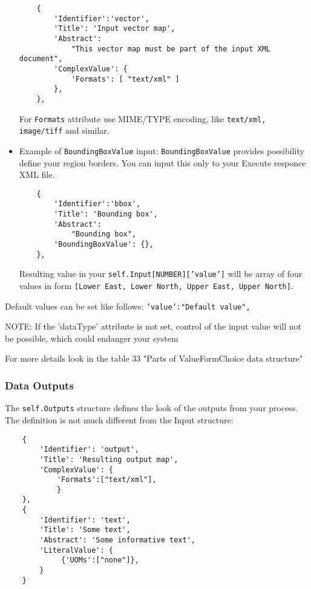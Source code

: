 \documentclass[a4paper,11pt]{article}
\begin{document}
\begin{itemize}
    \begin{verbatim}
    {
        'Identifier':'vector',
        'Title': 'Input vector map',
        'Abstract':
            "This vector map must be part of the input XML document",
        'ComplexValue': {
            'Formats': [ "text/xml" ]
        },
    },
    \end{verbatim}

    For \texttt{Formats} attribute use MIME/TYPE encoding, like
    \texttt{text/xml, image/tiff} and similar.

        \item Example of \texttt{BoundingBoxValue} input:
        \texttt{BoundingBoxValue} provides possibility define your region
        borders. You can input this only to your Execute responce XML file.

    \begin{verbatim}
    {
        'Identifier':'bbox',
        'Title': 'Bounding box',
        'Abstract':
            "Bounding box",
        'BoundingBoxValue': {},
    },
    \end{verbatim}

    Resulting value in your \texttt{self.Input[NUMBER]['value']} will be
    array of four values in form \texttt{[Lower East, Lower North, Upper
    East, Upper North]}.
         
    \end{itemize}


     
    Default values can be set like follows: \texttt{'value':"Default value",}

    NOTE: If the 'dataType' attribute is not set, control of the input value
    will not be possible, which could endanger your system
     
    For more details look in the table 33 "Parts of ValueFormChoice data
    structure"


    \subsubsection{Data Outputs}
     
    The \texttt{self.Outputs} structure defines the look of the outputs from your process.
    The definition is not much different from the Input structure:
     

    \begin{verbatim}
    {
        'Identifier': 'output',
        'Title': 'Resulting output map',
        'ComplexValue': {
            'Formats':["text/xml"],
            }
    },
    {
        'Identifier': 'text',
        'Title': 'Some text',
        'Abstract': 'Some informative text',
        'LiteralValue': {
             {'UOMs':["none"]},
        }
    }
    \end{verbatim}
\end{document}
